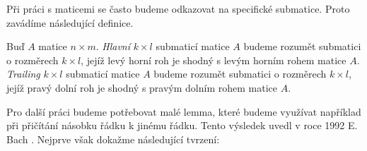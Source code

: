 Při práci s maticemi se často budeme odkazovat na specifické submatice. Proto
zavádíme následující definice.
\begin{defi}\label{hlavni_submatice}
    Buď $ A $ matice $ n \times m $. \textit{Hlavní} $ k \times l $ submaticí matice $ A $
    budeme rozumět submatici o rozměrech $ k \times l $, jejíž levý horní roh
    je shodný s levým horním rohem matice $ A $.
    \textit{Trailing} $ k \times l $ submaticí matice $ A $ budeme rozumět submatici o
    rozměrech $ k \times l $, jejíž pravý dolní roh je shodný s pravým dolním
    rohem matice $ A $.
\end{defi}

Pro další práci budeme potřebovat malé lemma, které budeme využívat
například při přičítání násobku řádku k jinému řádku. Tento výsledek uvedl
v roce 1992 E. Bach \cite{Bach}. Nejprve však dokažme následující tvrzení:

